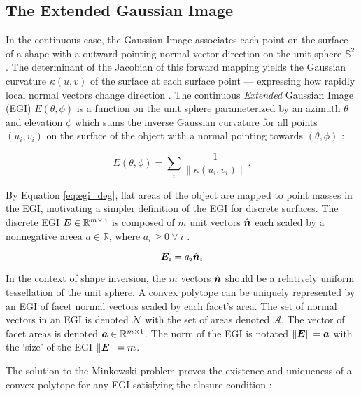 \subsection{The Extended Gaussian Image} \label{sec:egi_definition}

In the continuous case, the Gaussian Image associates each point on the surface of a shape with a outward-pointing normal vector direction on the unit sphere $\mathbb{S}^2$ \cite{horn1984}. The determinant of the Jacobian of this forward mapping yields the Gaussian curvature $\kappa(u,v)$ of the surface at each surface point --- expressing how rapidly local normal vectors change direction \cite{horn1984}. The continuous \textit{Extended} Gaussian Image (EGI) $E(\theta, \phi)$ is a function on the unit sphere parameterized by an azimuth $\theta$ and elevation $\phi$ which sums the inverse Gaussian curvature for all points $(u_i, v_i)$ on the surface of the object with a normal pointing towards $(\theta, \phi)$ \cite{horn1984}:

\begin{equation} \label{eq:egi_deg}
  E(\theta, \phi) = \sum_i{\frac{1}{\| \kappa(u_i, v_i) \|}}.
\end{equation}

By Equation \ref{eq:egi_deg}, flat areas of the object are mapped to point masses in the EGI, motivating a simpler definition of the EGI for discrete surfaces. The discrete EGI $\bm{E} \in \mathbb{R}^{m \times 3}$ is composed of $m$ unit vectors $\hat{\bm{n}}$ each scaled by a nonnegative areea $a \in \mathbb{R}$, where $a_i \geq 0 \: \forall \: i$ \cite{little1983}.

\begin{equation}
  \bm{E}_i = a_i \hat{\bm{n}}_i
\end{equation}

In the context of shape inversion, the $m$ vectors $\hat{\bm{n}}$ should be a relatively uniform tessellation of the unit sphere. A convex polytope can be uniquely represented by an EGI of facet normal vectors scaled by each facet's area. The set of normal vectors in an EGI is denoted $\mathcal{N}$ with the set of areas denoted $\mathcal{A}$. The vector of facet areas is denoted $\bm{a} \in \mathbb{R}^{m \times 1}$. The norm of the EGI is notated $\| \bm{E} \| = \bm{a}$ with the `size' of the EGI $\|\bm{E}\| = m$.

The solution to the Minkowski problem proves the existence and uniqueness of a convex polytope for any EGI satisfying the closure condition \cite{minkowski1909}:

